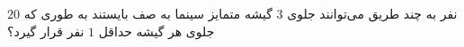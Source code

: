 $20$ 
نفر به چند طریق می‌توانند جلوی
$3$
گیشه متمایز سینما به صف بایستند به طوری که جلوی هر گیشه حداقل
$1$ 
 نفر قرار گیرد؟